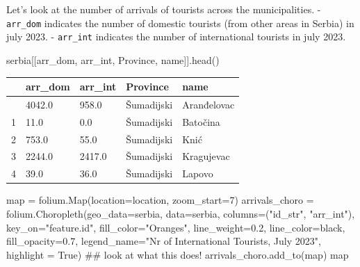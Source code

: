\documentclass[
  letterpaper,
  DIV=11,
  numbers=noendperiod]{scrreprt}
\newenvironment{Shaded}{\begin{snugshade}}{\end{snugshade}}
\newcommand{\BuiltInTok}[1]{\textcolor[rgb]{0.00,0.23,0.31}{#1}}
\newcommand{\CommentTok}[1]{\textcolor[rgb]{0.37,0.37,0.37}{#1}}
\newcommand{\DecValTok}[1]{\textcolor[rgb]{0.68,0.00,0.00}{#1}}
\newcommand{\FloatTok}[1]{\textcolor[rgb]{0.68,0.00,0.00}{#1}}
\newcommand{\NormalTok}[1]{\textcolor[rgb]{0.00,0.23,0.31}{#1}}
\newcommand{\OperatorTok}[1]{\textcolor[rgb]{0.37,0.37,0.37}{#1}}
\newcommand{\StringTok}[1]{\textcolor[rgb]{0.13,0.47,0.30}{#1}}
\newcommand{\VariableTok}[1]{\textcolor[rgb]{0.07,0.07,0.07}{#1}}
\begin{document}
Let's look at the number of arrivals of tourists across the
municipalities. - \texttt{arr\_dom} indicates the number of domestic
tourists (from other areas in Serbia) in july 2023. - \texttt{arr\_int}
indicates the number of international tourists in july 2023.

\begin{Shaded}
\begin{Highlighting}[]
\NormalTok{serbia[[}\StringTok{\textquotesingle{}arr\_dom\textquotesingle{}}\NormalTok{, }\StringTok{\textquotesingle{}arr\_int\textquotesingle{}}\NormalTok{, }\StringTok{\textquotesingle{}Province\textquotesingle{}}\NormalTok{, }\StringTok{\textquotesingle{}name\textquotesingle{}}\NormalTok{]].head()}
\end{Highlighting}
\end{Shaded}

\begin{longtable}[]{@{}lllll@{}}
\toprule\noalign{}
& arr\_dom & arr\_int & Province & name \\
\midrule\noalign{}
\endhead
\bottomrule\noalign{}
\endlastfoot
0 & 4042.0 & 958.0 & Šumadijski & Aranđelovac \\
1 & 11.0 & 0.0 & Šumadijski & Batočina \\
2 & 753.0 & 55.0 & Šumadijski & Knić \\
3 & 2244.0 & 2417.0 & Šumadijski & Kragujevac \\
4 & 39.0 & 36.0 & Šumadijski & Lapovo \\
\end{longtable}

\begin{Shaded}
\begin{Highlighting}[]
\BuiltInTok{map} \OperatorTok{=}\NormalTok{ folium.Map(location}\OperatorTok{=}\NormalTok{location, zoom\_start}\OperatorTok{=}\DecValTok{7}\NormalTok{)}
\NormalTok{arrivals\_choro }\OperatorTok{=}\NormalTok{ folium.Choropleth(geo\_data}\OperatorTok{=}\NormalTok{serbia, data}\OperatorTok{=}\NormalTok{serbia, columns}\OperatorTok{=}\NormalTok{(}\StringTok{"id\_str"}\NormalTok{, }\StringTok{"arr\_int"}\NormalTok{), key\_on}\OperatorTok{=}\StringTok{"feature.id"}\NormalTok{,}
\NormalTok{                                    fill\_color}\OperatorTok{=}\StringTok{"Oranges"}\NormalTok{, line\_weight}\OperatorTok{=}\FloatTok{0.2}\NormalTok{, line\_color}\OperatorTok{=}\StringTok{\textquotesingle{}black\textquotesingle{}}\NormalTok{, fill\_opacity}\OperatorTok{=}\FloatTok{0.7}\NormalTok{,}
\NormalTok{                                    legend\_name}\OperatorTok{=}\StringTok{"Nr of International Tourists, July 2023"}\NormalTok{, }
\NormalTok{                                    highlight }\OperatorTok{=} \VariableTok{True}\NormalTok{) }\CommentTok{\#\# look at what this does!}
\NormalTok{arrivals\_choro.add\_to(}\BuiltInTok{map}\NormalTok{)}
\BuiltInTok{map}
\end{Highlighting}
\end{Shaded}
\end{document}
